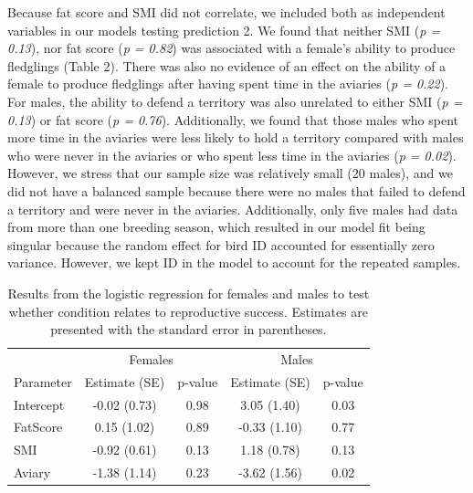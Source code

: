 \documentclass[
]{article}
\begin{document}
Because fat score and SMI did not correlate, we included both as
independent variables in our models testing prediction 2. We found that
neither SMI (\emph{p = 0.13}), nor fat score (\emph{p = 0.82}) was
associated with a female's ability to produce fledglings (Table 2).
There was also no evidence of an effect on the ability of a female to
produce fledglings after having spent time in the aviaries (\emph{p =
0.22}). For males, the ability to defend a territory was also unrelated
to either SMI (\emph{p = 0.13}) or fat score (\emph{p = 0.76}).
Additionally, we found that those males who spent more time in the
aviaries were less likely to hold a territory compared with males who
were never in the aviaries or who spent less time in the aviaries
(\emph{p = 0.02}). However, we stress that our sample size was
relatively small (20 males), and we did not have a balanced sample
because there were no males that failed to defend a territory and were
never in the aviaries. Additionally, only five males had data from more
than one breeding season, which resulted in our model fit being singular
because the random effect for bird ID accounted for essentially zero
variance. However, we kept ID in the model to account for the repeated
samples.

\begin{table}

\caption{\label{tab:p2 main results}Results from the logistic regression for females and males to test whether condition relates to reproductive success. Estimates are presented with the standard error in parentheses.}
\centering
\begin{tabular}[t]{l|c|c|c|c}
\hline
\multicolumn{1}{c|}{ } & \multicolumn{2}{c|}{Females} & \multicolumn{2}{c}{Males} \\
\cline{2-3} \cline{4-5}
Parameter & Estimate (SE) & p-value & Estimate (SE) & p-value\\
\hline
Intercept & -0.02 (0.73) & 0.98 & 3.05 (1.40) & 0.03\\
\hline
FatScore & 0.15 (1.02) & 0.89 & -0.33 (1.10) & 0.77\\
\hline
SMI & -0.92 (0.61) & 0.13 & 1.18 (0.78) & 0.13\\
\hline
Aviary & -1.38 (1.14) & 0.23 & -3.62 (1.56) & 0.02\\
\hline
\end{tabular}
\end{table}
\end{document}
